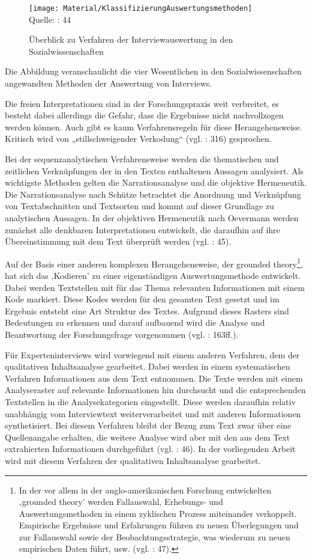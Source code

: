 \begin{figure}
\caption{Überblick zu Verfahren der Interviewauswertung in den Sozialwissenschaften}
\texttt{[image: Material/KlassifizierungAuswertungsmethoden]}\\
\scriptsize{Quelle: \cite{glalau10} : 44}
\end{figure}
Die Abbildung veranschaulicht die vier Wesentlichen in den Sozialwissenschaften angewandten Methoden der Auswertung von Interviews.\par
Die freien Interpretationen sind in der Forschungspraxis weit verbreitet, es besteht dabei allerdings die Gefahr, dass die Ergebnisse nicht nachvollzogen werden können. Auch gibt es kaum Verfahrensregeln für diese Herangehensweise. Kritisch wird von „stillschweigender Verkodung“ (vgl. \cite{hopf} : 316) gesprochen.\par
Bei der sequenzanalytischen Verfahrensweise werden die thematischen und zeitlichen Verknüpfungen der in den Texten enthaltenen Aussagen analysiert. Als wichtigste Methoden gelten die Narrationsanalyse und die objektive Hermeneutik. Die Narrationsanalyse nach Schütze betrachtet die Anordnung und Verknüpfung von Textabschnitten und Textsorten und kommt auf dieser Grundlage zu analytischen Aussagen. In der objektiven Hermeneutik nach Oevermann werden zunächst alle denkbaren Interpretationen entwickelt, die daraufhin auf ihre Übereinstimmung mit dem Text überprüft werden (vgl. \cite{glalau10} : 45).\par
Auf der Basis einer anderen komplexen Herangehensweise, der grounded theory\footnote{In der vor allem in der anglo-amerikanischen Forschung entwickelten ‚grounded theory’ werden Fallauswahl, Erhebungs- und Auswertungsmethoden in einem zyklischen Prozess miteinander verkoppelt. Empirische Ergebnisse und Erfahrungen führen zu neuen Überlegungen und zur Fallauswahl sowie der Beobachtungsstrategie, was wiederum zu neuen empirischen Daten führt, usw. (vgl. \cite{glalau10} : 47).}, hat sich das ‚Kodieren’ zu einer eigenständigen Auswertungsmethode entwickelt. Dabei werden Textstellen mit für das Thema relevanten Informationen mit einem Kode markiert. Diese Kodes werden für den gesamten Text gesetzt und im Ergebnis entsteht eine Art Struktur des Textes. Aufgrund dieses Rasters sind Bedeutungen zu erkennen und darauf aufbauend wird die Analyse und Beantwortung der Forschungsfrage vorgenommen (vgl. \cite{kruse} : 163ff.).\par
Für Experteninterviews wird vorwiegend mit einem anderen Verfahren, dem der qualitativen Inhaltsanalyse gearbeitet. Dabei werden in einem systematischen Verfahren Informationen aus dem Text entnommen. Die Texte werden mit einem Analyseraster auf relevante Informationen hin durchsucht und die entsprechenden Textstellen in die Analysekategorien eingestellt. Diese werden daraufhin relativ unabhängig vom Interviewtext weiterverarbeitet und mit anderen Informationen synthetisiert. Bei diesem Verfahren bleibt der Bezug zum Text zwar über eine Quellenangabe erhalten, die weitere Analyse wird aber mit den aus dem Text extrahierten Informationen durchgeführt (vgl. \cite{glalau10} : 46). In der vorliegenden Arbeit wird mit diesem Verfahren der qualitativen Inhaltsanalyse gearbeitet. \par
